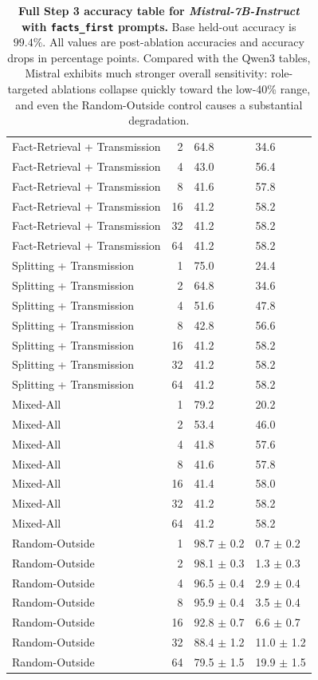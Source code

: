 \documentclass[11pt]{article}
\begin{document}
\begin{table}[p]
{\begin{tabular}{@{} l r l l @{}}
Fact-Retrieval + Transmission & 2 & 64.8 & 34.6 \\
Fact-Retrieval + Transmission & 4 & 43.0 & 56.4 \\
Fact-Retrieval + Transmission & 8 & 41.6 & 57.8 \\
Fact-Retrieval + Transmission & 16 & 41.2 & 58.2 \\
Fact-Retrieval + Transmission & 32 & 41.2 & 58.2 \\
Fact-Retrieval + Transmission & 64 & 41.2 & 58.2 \\
Splitting + Transmission & 1 & 75.0 & 24.4 \\
Splitting + Transmission & 2 & 64.8 & 34.6 \\
Splitting + Transmission & 4 & 51.6 & 47.8 \\
Splitting + Transmission & 8 & 42.8 & 56.6 \\
Splitting + Transmission & 16 & 41.2 & 58.2 \\
Splitting + Transmission & 32 & 41.2 & 58.2 \\
Splitting + Transmission & 64 & 41.2 & 58.2 \\
Mixed-All & 1 & 79.2 & 20.2 \\
Mixed-All & 2 & 53.4 & 46.0 \\
Mixed-All & 4 & 41.8 & 57.6 \\
Mixed-All & 8 & 41.6 & 57.8 \\
Mixed-All & 16 & 41.4 & 58.0 \\
Mixed-All & 32 & 41.2 & 58.2 \\
Mixed-All & 64 & 41.2 & 58.2 \\
Random-Outside & 1 & 98.7 $\pm$ 0.2 & 0.7 $\pm$ 0.2 \\
Random-Outside & 2 & 98.1 $\pm$ 0.3 & 1.3 $\pm$ 0.3 \\
Random-Outside & 4 & 96.5 $\pm$ 0.4 & 2.9 $\pm$ 0.4 \\
Random-Outside & 8 & 95.9 $\pm$ 0.4 & 3.5 $\pm$ 0.4 \\
Random-Outside & 16 & 92.8 $\pm$ 0.7 & 6.6 $\pm$ 0.7 \\
Random-Outside & 32 & 88.4 $\pm$ 1.2 & 11.0 $\pm$ 1.2 \\
Random-Outside & 64 & 79.5 $\pm$ 1.5 & 19.9 $\pm$ 1.5 \\
\bottomrule
\end{tabular}%
}
\caption{\textbf{Full Step 3 accuracy table for \textit{Mistral-7B-Instruct} with \texttt{facts\_first} prompts.} Base held-out accuracy is $99.4\%$. All values are post-ablation accuracies and accuracy drops in percentage points. Compared with the Qwen3 tables, Mistral exhibits much stronger overall sensitivity: role-targeted ablations collapse quickly toward the low-40\% range, and even the Random-Outside control causes a substantial degradation.}
\label{tab:mistral_ff_full_accuracy}
\end{table}
\end{document}
